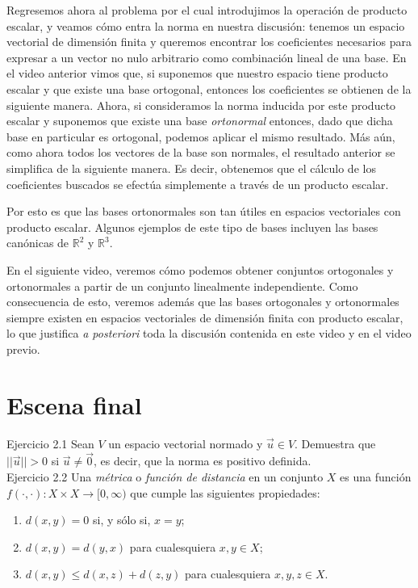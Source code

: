 \documentclass[12pt,dvipsnames]{article}
\numberwithin{equation}{section}
\begin{document}
Regresemos ahora al problema por el cual introdujimos la operación de producto escalar, y veamos cómo entra la norma en nuestra discusión: tenemos un espacio vectorial de dimensión finita y queremos encontrar los coeficientes necesarios para expresar a un vector no nulo arbitrario como combinación lineal de una base. En el video anterior vimos que, si suponemos que nuestro espacio tiene producto escalar y que existe una base ortogonal, entonces los coeficientes se obtienen de la siguiente manera. Ahora, si consideramos la norma inducida por este producto escalar y suponemos que existe una base \emph{ortonormal} entonces, dado que dicha base en particular es ortogonal, podemos aplicar el mismo resultado. Más aún, como ahora todos los vectores de la base son normales, el resultado anterior se simplifica de la siguiente manera. Es decir, obtenemos que el cálculo de los coeficientes buscados se efectúa simplemente a través de un producto escalar.

Por esto es que las bases ortonormales son tan útiles en espacios vectoriales con producto escalar. Algunos ejemplos de este tipo de bases incluyen las bases canónicas de $\mathbb{R}^2$ y $\mathbb{R}^3$. 

En el siguiente video, veremos cómo podemos obtener conjuntos ortogonales y ortonormales a partir de un conjunto linealmente independiente. Como consecuencia de esto, veremos además que las bases ortogonales y ortonormales siempre existen en espacios vectoriales de dimensión finita con producto escalar, lo que justifica \emph{a posteriori} toda la discusión contenida en este video y en el video previo.


\newpage
\section{Escena final}


Ejercicio 2.1 Sean $V$ un espacio vectorial normado y $\vec{u}\in V$. Demuestra que $||\vec{u}||>0$ si $\vec{u}\neq \vec{0}$, es decir, que la norma es positivo definida. \\

Ejercicio 2.2 Una \emph{métrica} o \emph{función de distancia} en un conjunto $X$ es una función $f(\cdot, \cdot ):X\times X\to [0,\infty)$ que cumple las siguientes propiedades:
\begin{enumerate}[label=(\roman*)]
    \item $d(x,y)=0$ si, y sólo si, $x=y$;

    \item $d(x,y)=d(y,x)$ para cualesquiera $x,y\in X$;

    \item $d(x,y) \le d(x,z) + d(z,y)$ para cualesquiera $x,y,z\in X$.
\end{enumerate}
\end{document}
